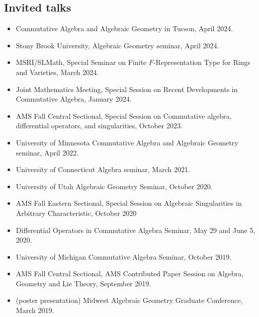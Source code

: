 \documentclass{res}
\begin{document}
\begin{resume}
\section{Invited talks}
\begin{itemize}
\item Commutative Algebra and Algebraic Geometry in Tucson, April 2024.
\item Stony Brook University, Algebraic Geometry seminar, April 2024.
\item MSRI/SLMath, Special Seminar on Finite $F$-Representation Type for Rings and Varieties, March 2024.
\item Joint Mathematics Meeting, Special Session on Recent Developments in Commutative Algebra, January 2024.
\item 
AMS Fall Central Sectional, Special Session on Commutative algebra, differential operators, and singularities, October 2023.
\item 
University of Minnesota Commutative Algebra and Algebraic Geometry seminar, April 2022.
\item 
University of Connecticut Algebra seminar, March 2021.
\item 
University of Utah Algebraic Geometry Seminar, October 2020.
\item 
AMS Fall Eastern Sectional, Special Session on Algebraic Singularities in Arbitrary Characteristic, October 2020
\item 
Differential Operators in Commutative Algebra Seminar, May 29 and June 5, 2020.
\item 
University of Michigan Commutative Algebra Seminar, October 2019.
\item 
AMS Fall Central Sectional, AMS Contributed Paper Session on Algebra, Geometry and Lie Theory, September 2019.
\item (poster presentation) 
Midwest Algebraic Geometry Graduate Conference, March 2019.
\end{itemize}



\end{resume}
\end{document}
